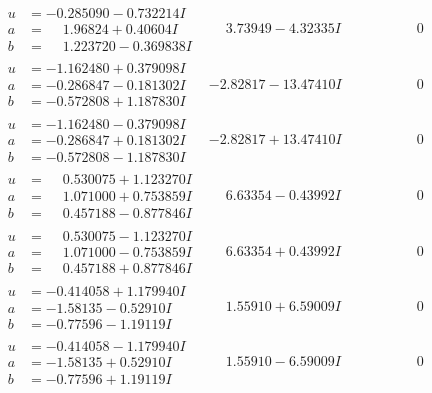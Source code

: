 \documentclass[1p]{elsarticle_modified}
\theoremstyle{definition}
\begin{document}
$$\begin{array}{c|c|c}
\begin{aligned}
u &= -0.285090 - 0.732214 I \\
a &= \phantom{-}1.96824 + 0.40604 I \\
b &= \phantom{-}1.223720 - 0.369838 I\end{aligned}
 & \phantom{-}3.73949 - 4.32335 I & \phantom{-0.000000 } 0 \\ \hline\begin{aligned}
u &= -1.162480 + 0.379098 I \\
a &= -0.286847 - 0.181302 I \\
b &= -0.572808 + 1.187830 I\end{aligned}
 & -2.82817 - 13.47410 I & \phantom{-0.000000 } 0 \\ \hline\begin{aligned}
u &= -1.162480 - 0.379098 I \\
a &= -0.286847 + 0.181302 I \\
b &= -0.572808 - 1.187830 I\end{aligned}
 & -2.82817 + 13.47410 I & \phantom{-0.000000 } 0 \\ \hline\begin{aligned}
u &= \phantom{-}0.530075 + 1.123270 I \\
a &= \phantom{-}1.071000 + 0.753859 I \\
b &= \phantom{-}0.457188 - 0.877846 I\end{aligned}
 & \phantom{-}6.63354 - 0.43992 I & \phantom{-0.000000 } 0 \\ \hline\begin{aligned}
u &= \phantom{-}0.530075 - 1.123270 I \\
a &= \phantom{-}1.071000 - 0.753859 I \\
b &= \phantom{-}0.457188 + 0.877846 I\end{aligned}
 & \phantom{-}6.63354 + 0.43992 I & \phantom{-0.000000 } 0 \\ \hline\begin{aligned}
u &= -0.414058 + 1.179940 I \\
a &= -1.58135 - 0.52910 I \\
b &= -0.77596 - 1.19119 I\end{aligned}
 & \phantom{-}1.55910 + 6.59009 I & \phantom{-0.000000 } 0 \\ \hline\begin{aligned}
u &= -0.414058 - 1.179940 I \\
a &= -1.58135 + 0.52910 I \\
b &= -0.77596 + 1.19119 I\end{aligned}
 & \phantom{-}1.55910 - 6.59009 I & \phantom{-0.000000 } 0 \\ \hline\begin{aligned}

\end{aligned}
\end{array}$$
\end{document}
